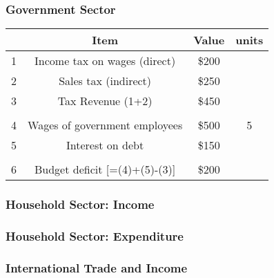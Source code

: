 \documentclass[12pt, letterpaper]{article}
\begin{document}
{\subsubsection{Government Sector}

\begin{center}
	\begin{tabular}{|c|c|c|c|}
	\hline
	& Item & Value & units\\
	\hline
	1 & Income tax on wages (direct) & \$200 & \\
	\hline
	2 & Sales tax (indirect) & \$250 & \\
	\hline
	3 & Tax Revenue (1+2) & \$450 & \\
	\hline
	& & &\\
	\hline
	4 & Wages of government employees & \$500 & 5\\
	\hline
	5 & Interest on debt & \$150 & \\
	\hline
	& & &\\
	\hline
	6 & Budget deficit [=(4)+(5)-(3)] & \$200 & \\
	\hline
	\end{tabular}
\end{center}

\subsubsection{Household Sector: Income}


\subsubsection{Household Sector: Expenditure}


\subsubsection{International Trade and Income}

}
\end{document}
